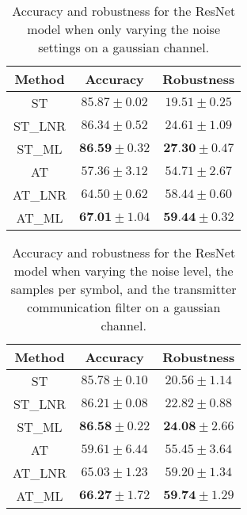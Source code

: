 \documentclass[conference]{IEEEtran}
\begin{document}

\begin{table}[htbp]
	\centering
	\begin{tabular}{c|cc}
	    Method & Accuracy & Robustness \\
		\hline
		ST & $85.87 \pm 0.02$ & $19.51 \pm 0.25$ \\ 
		ST\_LNR & $86.34 \pm 0.52$ & $24.61 \pm 1.09$ \\ 
		ST\_ML & $\textbf{86.59} \pm 0.32$ & $\textbf{27.30} \pm 0.47$ \\ 
		\hline
		AT & $57.36 \pm 3.12$ & $54.71 \pm 2.67$ \\ 
		AT\_LNR & $64.50 \pm 0.62$ & $58.44 \pm 0.60$ \\ 
		AT\_ML & $\textbf{67.01} \pm 1.04$ & $\textbf{59.44} \pm 0.32$ \\ 
    \end{tabular}
    \caption{Accuracy and robustness for the ResNet model when only varying the noise settings on a gaussian channel.}
    \label{tab:sbasic}
\end{table}

\begin{table}[htbp]
	\centering
	\begin{tabular}{c|cc}
	    Method & Accuracy & Robustness \\
		\hline
		ST & $85.78 \pm 0.10$ & $20.56 \pm 1.14$ \\ 
		ST\_LNR & $86.21 \pm 0.08$ & $22.82 \pm 0.88$ \\ 
		ST\_ML & $\textbf{86.58} \pm 0.22$ & $\textbf{24.08} \pm 2.66$ \\
        \hline
		AT & $59.61 \pm 6.44$ & $55.45 \pm 3.64$ \\ 
		AT\_LNR & $65.03 \pm 1.23$ & $59.20 \pm 1.34$ \\ 
		AT\_ML & $\textbf{66.27} \pm 1.72$ & $\textbf{59.74} \pm 1.29$ \\ 
    \end{tabular}
    \caption{Accuracy and robustness for the ResNet model when varying the noise level, the samples per symbol, and the transmitter communication filter on a gaussian channel.}
    \label{tab:sawgn2p}
\end{table}
\end{document}
